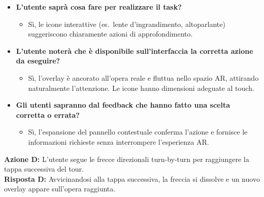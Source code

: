 \begin{itemize}[nosep, leftmargin=1.6em]
    \item \textbf{L'utente saprà cosa fare per realizzare il task?}
    \begin{itemize}[nosep, leftmargin=1.6em]
        \item Sì, le icone interattive (es.\ lente d'ingrandimento, altoparlante) suggeriscono chiaramente azioni di approfondimento.
    \end{itemize}
    \item \textbf{L'utente noterà che è disponibile sull'interfaccia la corretta azione da eseguire?}
    \begin{itemize}[nosep, leftmargin=1.6em]
        \item Sì, l'overlay è ancorato all'opera reale e fluttua nello spazio AR, attirando naturalmente l'attenzione. Le icone hanno dimensioni adeguate al touch.
    \end{itemize}
    \item \textbf{Gli utenti sapranno dal feedback che hanno fatto una scelta corretta o errata?}
    \begin{itemize}[nosep, leftmargin=1.6em]
        \item Sì, l'espansione del pannello contestuale conferma l'azione e fornisce le informazioni richieste senza interrompere l'esperienza AR.
    \end{itemize}
\end{itemize}

\vspace{0.3cm}
\noindent\textbf{Azione D:} L'utente segue le frecce direzionali turn-by-turn per raggiungere la tappa successiva del tour.\\
\textbf{Risposta D:} Avvicinandosi alla tappa successiva, la freccia si dissolve e un nuovo overlay appare sull'opera raggiunta.

